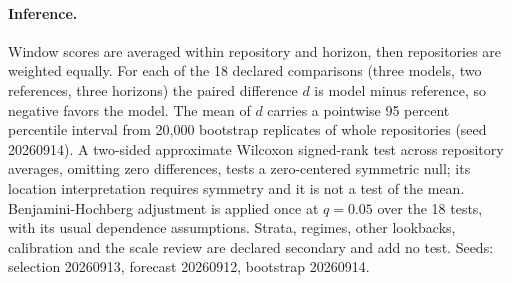 \paragraph{Inference.} Window scores are averaged within repository and horizon, then repositories are
weighted equally. For each of the 18 declared comparisons (three models, two references, three horizons)
the paired difference $d$ is model minus reference, so negative favors the model. The mean of $d$ carries a
pointwise 95 percent percentile interval from 20,000 bootstrap replicates of whole repositories (seed
20260914). A two-sided approximate Wilcoxon signed-rank test across repository averages, omitting zero
differences, tests a zero-centered symmetric null; its location interpretation requires symmetry and it is
not a test of the mean. Benjamini-Hochberg adjustment is applied once at $q = 0.05$ over the 18 tests, with
its usual dependence assumptions. Strata, regimes, other lookbacks, calibration and the scale review are
declared secondary and add no test. Seeds: selection 20260913, forecast 20260912, bootstrap 20260914.
